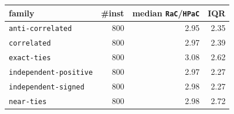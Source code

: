\begin{tabular}{@{}lrrr@{}}
\toprule
family & \#inst & median \texttt{RaC}/\texttt{HPaC} & IQR \\
\midrule
\texttt{anti-correlated} & 800 & 2.95 & 2.35 \\
\texttt{correlated} & 800 & 2.97 & 2.39 \\
\texttt{exact-ties} & 800 & 3.08 & 2.62 \\
\texttt{independent-positive} & 800 & 2.97 & 2.27 \\
\texttt{independent-signed} & 800 & 2.98 & 2.27 \\
\texttt{near-ties} & 800 & 2.98 & 2.72 \\
\bottomrule
\end{tabular}
